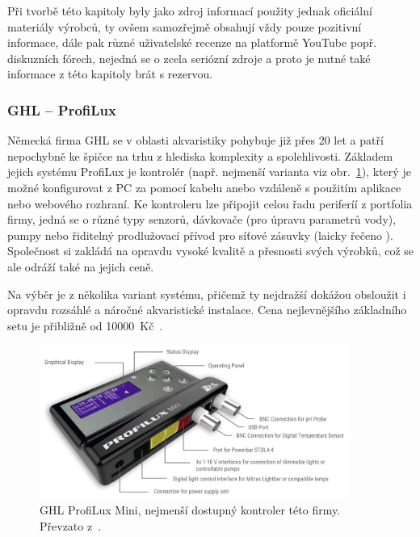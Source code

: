         Při tvorbě této kapitoly byly jako zdroj informací použity jednak oficiální materiály výrobců, ty ovšem samozřejmě obsahují vždy pouze pozitivní informace, dále pak různé uživatelské recenze na platformě YouTube popř. diskuzních fórech, nejedná se o zcela seriózní zdroje a proto je nutné také informace z této kapitoly brát s rezervou. 

        \subsubsection{GHL -- ProfiLux}
            Německá firma GHL se v oblasti akvaristiky pohybuje již přes 20 let a patří nepochybně ke špičce na trhu z hlediska komplexity a spolehlivosti. Základem jejich systému ProfiLux je kontrolér (např. nejmenší varianta viz obr.~\ref{fig:obrazky-trh-GHL-ProfiLux-Mini-jpg}), který je možné konfigurovat z PC za pomocí kabelu anebo vzdáleně s použitím aplikace nebo webového rozhraní. Ke kontroleru lze připojit celou řadu periferíí z portfolia firmy, jedná se o různé typy senzorů, dávkovače (pro úpravu parametrů vody), pumpy nebo řiditelný prodlužovací přívod pro síťové zásuvky (laicky řečeno ). Společnost si zakládá na opravdu vysoké kvalitě a přesnosti svých výrobků, což se ale odráží také na jejich ceně. 

            Na výběr je z několika variant systému, přičemž ty nejdražší dokážou obsloužit i opravdu rozsáhlé a náročné akvaristické instalace. Cena nejlevnějšího základního setu je přibližně od \qty{10000}{Kč}~\cite{ghl-profilux,eshop-ghl-profilux-sets}.

            \begin{figure}[h!]
                \centering
                \includegraphics[width=0.9\textwidth]{obrazky/trh/GHL-ProfiLux-Mini.jpg}
                \caption{GHL ProfiLux Mini, nejmenší dostupný kontroler této firmy. Převzato z~\cite{ghl-profilux}.}
                \label{fig:obrazky-trh-GHL-ProfiLux-Mini-jpg}
            \end{figure}
            
